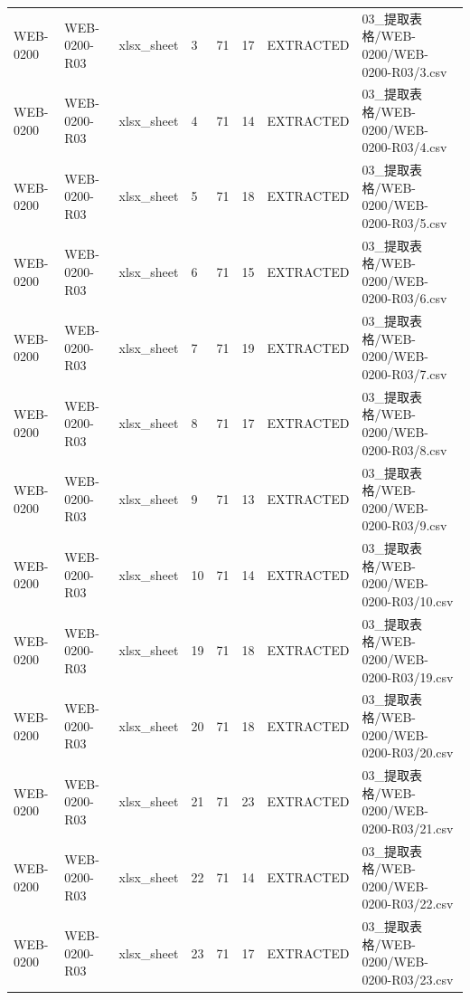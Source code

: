 \begin{landscape}
\begin{longtable}{p{1.8cm}p{2.2cm}p{3.1cm}p{4.7cm}p{1.3cm}p{1.3cm}p{3.0cm}p{5.3cm}}
WEB-0200 & WEB-0200-R03 & xlsx\_\allowbreak{}sheet & 3 & 71 & 17 & EXTRACTED & 03\_\allowbreak{}提取表格/\allowbreak{}WEB-0200/\allowbreak{}WEB-0200-R03/\allowbreak{}3.csv\\
WEB-0200 & WEB-0200-R03 & xlsx\_\allowbreak{}sheet & 4 & 71 & 14 & EXTRACTED & 03\_\allowbreak{}提取表格/\allowbreak{}WEB-0200/\allowbreak{}WEB-0200-R03/\allowbreak{}4.csv\\
WEB-0200 & WEB-0200-R03 & xlsx\_\allowbreak{}sheet & 5 & 71 & 18 & EXTRACTED & 03\_\allowbreak{}提取表格/\allowbreak{}WEB-0200/\allowbreak{}WEB-0200-R03/\allowbreak{}5.csv\\
WEB-0200 & WEB-0200-R03 & xlsx\_\allowbreak{}sheet & 6 & 71 & 15 & EXTRACTED & 03\_\allowbreak{}提取表格/\allowbreak{}WEB-0200/\allowbreak{}WEB-0200-R03/\allowbreak{}6.csv\\
WEB-0200 & WEB-0200-R03 & xlsx\_\allowbreak{}sheet & 7 & 71 & 19 & EXTRACTED & 03\_\allowbreak{}提取表格/\allowbreak{}WEB-0200/\allowbreak{}WEB-0200-R03/\allowbreak{}7.csv\\
WEB-0200 & WEB-0200-R03 & xlsx\_\allowbreak{}sheet & 8 & 71 & 17 & EXTRACTED & 03\_\allowbreak{}提取表格/\allowbreak{}WEB-0200/\allowbreak{}WEB-0200-R03/\allowbreak{}8.csv\\
WEB-0200 & WEB-0200-R03 & xlsx\_\allowbreak{}sheet & 9 & 71 & 13 & EXTRACTED & 03\_\allowbreak{}提取表格/\allowbreak{}WEB-0200/\allowbreak{}WEB-0200-R03/\allowbreak{}9.csv\\
WEB-0200 & WEB-0200-R03 & xlsx\_\allowbreak{}sheet & 10 & 71 & 14 & EXTRACTED & 03\_\allowbreak{}提取表格/\allowbreak{}WEB-0200/\allowbreak{}WEB-0200-R03/\allowbreak{}10.csv\\
WEB-0200 & WEB-0200-R03 & xlsx\_\allowbreak{}sheet & 19 & 71 & 18 & EXTRACTED & 03\_\allowbreak{}提取表格/\allowbreak{}WEB-0200/\allowbreak{}WEB-0200-R03/\allowbreak{}19.csv\\
WEB-0200 & WEB-0200-R03 & xlsx\_\allowbreak{}sheet & 20 & 71 & 18 & EXTRACTED & 03\_\allowbreak{}提取表格/\allowbreak{}WEB-0200/\allowbreak{}WEB-0200-R03/\allowbreak{}20.csv\\
WEB-0200 & WEB-0200-R03 & xlsx\_\allowbreak{}sheet & 21 & 71 & 23 & EXTRACTED & 03\_\allowbreak{}提取表格/\allowbreak{}WEB-0200/\allowbreak{}WEB-0200-R03/\allowbreak{}21.csv\\
WEB-0200 & WEB-0200-R03 & xlsx\_\allowbreak{}sheet & 22 & 71 & 14 & EXTRACTED & 03\_\allowbreak{}提取表格/\allowbreak{}WEB-0200/\allowbreak{}WEB-0200-R03/\allowbreak{}22.csv\\
WEB-0200 & WEB-0200-R03 & xlsx\_\allowbreak{}sheet & 23 & 71 & 17 & EXTRACTED & 03\_\allowbreak{}提取表格/\allowbreak{}WEB-0200/\allowbreak{}WEB-0200-R03/\allowbreak{}23.csv\\

\end{longtable}
\end{landscape}
